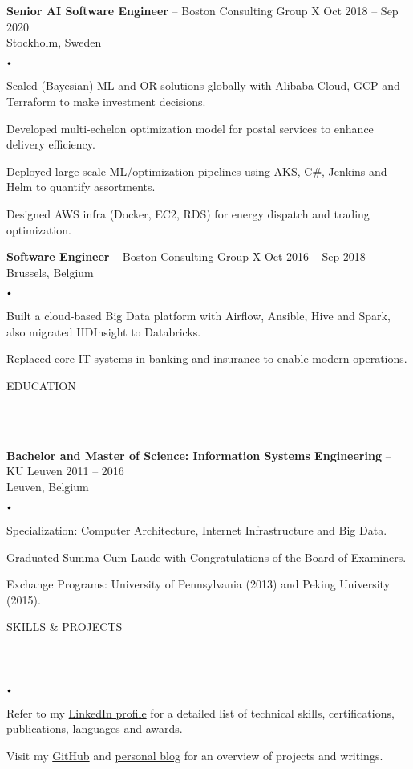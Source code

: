 \documentclass{article}
\newcommand{\header}[1]{
    {
        \hspace*{-4pt}
        \vspace*{8pt}
        \uppercase{#1}
    }
    \vspace*{-4pt} 
    \lineunder
    \vspace*{8pt}
}
\newcommand{\lineunder}{
    \vspace*{-8pt} \\ 
    \hspace*{-4pt} 
    \hrulefill \\
}
\newcommand{\experience}[5]{
    \vspace*{2pt}
    \textbf{#1} -- #2 \hfill #3 \\ 
    #4 \\
    #5
    \vspace*{2pt}
}
\newcommand{\spacedbullet}{
    $\vcenter{\hbox{\tiny$\bullet$}}$\hspace*{-2pt}
}
\newenvironment{bulletlist}{
    \begin{list}
        {\spacedbullet}{\setlength\leftmargin{10pt} 
        \topsep 0pt \itemsep -2pt}}{\vspace*{4pt}
    \end{list}
}
\begin{document}
\experience{Senior AI Software Engineer}{Boston Consulting Group X}{Oct 2018 -- Sep 2020}{Stockholm, Sweden}
{
    \begin{bulletlist}
        \item Scaled (Bayesian) ML and OR solutions globally with Alibaba Cloud, GCP and Terraform to make investment decisions.
        \item Developed multi-echelon optimization model for postal services to enhance delivery efficiency.
        \item Deployed large-scale ML/optimization pipelines using AKS, C\#, Jenkins and Helm to quantify assortments.
        \item Designed AWS infra (Docker, EC2, RDS) for energy dispatch and trading optimization.
    \end{bulletlist}
}

\experience{Software Engineer}{Boston Consulting Group X}{Oct 2016 -- Sep 2018}{Brussels, Belgium}
{
    \begin{bulletlist}
        \item Built a cloud-based Big Data platform with Airflow, Ansible, Hive and Spark, also migrated HDInsight to Databricks.
        \item Replaced core IT systems in banking and insurance to enable modern operations.
    \end{bulletlist}
}

\vspace*{4pt}

\header{Education}
\experience{Bachelor and Master of Science: Information Systems Engineering}{KU Leuven}{2011 -- 2016}{Leuven, Belgium}
{
    \begin{bulletlist}
        \item Specialization: Computer Architecture, Internet Infrastructure and Big Data.
        \item Graduated Summa Cum Laude with Congratulations of the Board of Examiners.
        \item Exchange Programs: University of Pennsylvania (2013) and Peking University (2015).
    \end{bulletlist}
}

\vspace*{4pt}
\header{Skills \& Projects}
\begin{bulletlist}
    \item Refer to my \href{https://linkedin.com/in/nielsdegrande/}{LinkedIn profile} for a detailed list of technical skills, certifications, publications, languages and awards.
    \item Visit my \href{https://github.com/NielsDegrande/}{GitHub} and \href{https://niels.degran.de/blog}{personal blog} for an overview of projects and writings.
\end{bulletlist}
\end{document}
